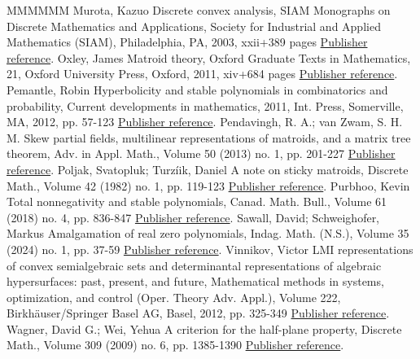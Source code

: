 \documentclass[11pt]{article}
\theoremstyle{definition}
\numberwithin{equation}{section}
\begin{document}
\begin{thebibliography}{MMMMMM}
 Murota, Kazuo Discrete convex analysis, SIAM Monographs on Discrete Mathematics and Applications, Society for Industrial and Applied Mathematics (SIAM), Philadelphia, PA, 2003, xxii+389 pages \href{https://alco.centre-mersenne.org/articles/10.5802/alco.399/#murota}{Publisher reference}.
 Oxley, James Matroid theory, Oxford Graduate Texts in Mathematics, 21, Oxford University Press, Oxford, 2011, xiv+684 pages \href{https://alco.centre-mersenne.org/articles/10.5802/alco.399/#oxley}{Publisher reference}.
 Pemantle, Robin Hyperbolicity and stable polynomials in combinatorics and probability, Current developments in mathematics, 2011, Int. Press, Somerville, MA, 2012, pp. 57-123 \href{https://alco.centre-mersenne.org/articles/10.5802/alco.399/#pemantle}{Publisher reference}.
 Pendavingh, R. A.; van Zwam, S. H. M. Skew partial fields, multilinear representations of matroids, and a matrix tree theorem, Adv. in Appl. Math., Volume 50 (2013) no. 1, pp. 201-227 \href{https://alco.centre-mersenne.org/articles/10.5802/alco.399/#skewpartial}{Publisher reference}.
 Poljak, Svatopluk; Turzíik, Daniel A note on sticky matroids, Discrete Math., Volume 42 (1982) no. 1, pp. 119-123 \href{https://alco.centre-mersenne.org/articles/10.5802/alco.399/#sticky}{Publisher reference}.
 Purbhoo, Kevin Total nonnegativity and stable polynomials, Canad. Math. Bull., Volume 61 (2018) no. 4, pp. 836-847 \href{https://alco.centre-mersenne.org/articles/10.5802/alco.399/#purbhoo}{Publisher reference}.
 Sawall, David; Schweighofer, Markus Amalgamation of real zero polynomials, Indag. Math. (N.S.), Volume 35 (2024) no. 1, pp. 37-59 \href{https://alco.centre-mersenne.org/articles/10.5802/alco.399/#rzamalgamation}{Publisher reference}.
 Vinnikov, Victor LMI representations of convex semialgebraic sets and determinantal representations of algebraic hypersurfaces: past, present, and future, Mathematical methods in systems, optimization, and control (Oper. Theory Adv. Appl.), Volume 222, Birkhäuser/Springer Basel AG, Basel, 2012, pp. 325-349 \href{https://alco.centre-mersenne.org/articles/10.5802/alco.399/#victorsurvey}{Publisher reference}.
 Wagner, David G.; Wei, Yehua A criterion for the half-plane property, Discrete Math., Volume 309 (2009) no. 6, pp. 1385-1390 \href{https://alco.centre-mersenne.org/articles/10.5802/alco.399/#wagnerwei}{Publisher reference}.
\end{thebibliography}
\end{document}
